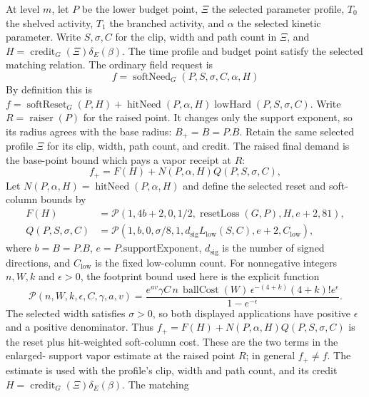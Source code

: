 At level $m$, let $P$ be the lower budget point, $\Xi$ the selected
parameter profile, $T_0$ the shelved activity, $T_1$ the branched
activity, and $\alpha$ the selected kinetic parameter. Write $S,\sigma,C$
for the clip, width and path count in $\Xi$, and
$H=\operatorname{credit}_G(\Xi)\delta_E(\beta)$. The time profile and
budget point satisfy the selected matching relation. The ordinary field
request is
\begin{equation}
 f=\operatorname{softNeed}_G(P,S,\sigma,C,\alpha,H)
 \label{eq:ex-lattice-multi-softneed}
\end{equation}
By definition this is
$f=\operatorname{softReset}_G(P,H)+\operatorname{hitNeed}(P,\alpha,H)
\operatorname{lowHard}(P,S,\sigma,C)$.
Write $R=\operatorname{raiser}(P)$ for the raised point. It changes only
the support exponent, so its radius agrees with the base radius:
$B_+=B=P.B$. Retain the
same selected profile $\Xi$ for its clip, width, path count, and credit.
The raised final demand is the base-point bound which pays a vapor receipt
at $R$:
\begin{equation}
 f_+=F(H)+N(P,\alpha,H)Q(P,S,\sigma,C),
 \label{eq:ex-lattice-multi-raised-demand}
\end{equation}
Let $N(P,\alpha,H)=\operatorname{hitNeed}(P,\alpha,H)$ and define the
selected reset and soft-column bounds by
\begin{align*}
 F(H)&=\mathcal P(1,4b+2,0,1/2,\operatorname{resetLoss}(G,P),
                          H,e+2,81),\\
 Q(P,S,\sigma,C)&=\mathcal P(1,b,0,\sigma/8,1,
     d_{\mathrm{sig}}L_{\mathrm{low}}(S,C),e+2,C_{\mathrm{low}}),
\end{align*}
where $b=B=P.B$, $e=P.\mathrm{supportExponent}$,
$d_{\mathrm{sig}}$ is the number of signed directions, and $C_{\mathrm{low}}$
is the fixed low-column count. For nonnegative integers $n,W,k$ and
$\epsilon>0$, the footprint bound used here is the explicit function
\[
 \mathcal P(n,W,k,\epsilon,C,\gamma,a,v)
 =\frac{e^{av}\gamma C\,n\,\operatorname{ballCost}(W)
         \,\epsilon^{-(4+k)}(4+k)!e^{\epsilon}}
        {1-e^{-\epsilon}}.
\]
The selected width satisfies $\sigma>0$, so both displayed applications
have positive $\epsilon$ and a positive denominator.
Thus $f_+=F(H)+N(P,\alpha,H)Q(P,S,\sigma,C)$ is the reset plus
hit-weighted soft-column cost. These are the two terms in the enlarged-
support vapor estimate at the raised point $R$; in general $f_+\ne f$.
The estimate is used with the profile's clip, width and path count, and its
credit $H=\operatorname{credit}_G(\Xi)\delta_E(\beta)$. The matching
